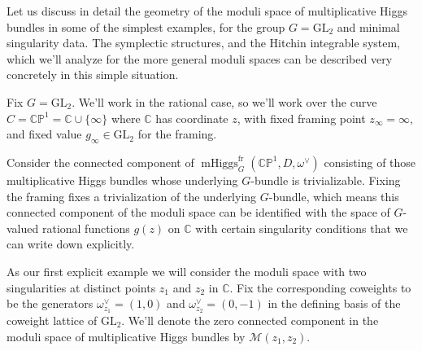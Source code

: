 \documentclass[11pt, oneside, reqno]{amsart}
\theoremstyle{definition} \newtheorem{definition}{Definition}[section]
\theoremstyle{definition} \newtheorem{remark}[definition]{Remark}
\theoremstyle{definition} \newtheorem{remarks}[definition]{Remarks}
\theoremstyle{definition} \newtheorem{question}[definition]{Question}
\theoremstyle{definition} \newtheorem*{note}{Note}
\theoremstyle{definition} \newtheorem{example}[definition]{Example}
\theoremstyle{definition} \newtheorem{examples}[definition]{Examples}
\newcommand{\bb}[1]{\mathbb{#1}}
\newcommand{\mc}[1]{\mathcal{#1}}
\newcommand{\CC}{\mathbb{C}}
\newcommand{\GL}{\mathrm{GL}}
\DeclareMathOperator{\mhiggs}{mHiggs}
\newcommand{\fr}{\mathrm{fr}}
\begin{document}
Let us discuss in detail the geometry of the moduli space of multiplicative Higgs bundles in some of the simplest examples, for the group $G = \GL_2$ and minimal singularity data.  The symplectic structures, and the Hitchin integrable system, which we'll analyze for the more general moduli spaces can be described very concretely in this simple situation. 

Fix $G=\GL_2$.  We'll work in the rational case, so we'll work over the curve $C = \bb{CP}^1 = \CC \cup \{\infty\}$ where $\CC$ has coordinate $z$, with fixed framing point $z_\infty = \infty$, and fixed value $g_\infty \in \GL_2$ for the framing. 

Consider the connected component of $\mhiggs^\fr_{G}(\bb{CP}^1, D, \omega^{\vee})$ consisting of those multiplicative Higgs bundles whose underlying $G$-bundle is trivializable.  Fixing the framing fixes a trivialization of the underlying $G$-bundle, which means this connected component of the moduli space can be identified with the space of $G$-valued
rational functions $g(z)$ on $\CC$ with certain singularity conditions that we can write down explicitly.

As our first explicit example we will consider the moduli space with two singularities at distinct points $z_1$ and $z_2$ in $\CC$.  Fix the corresponding coweights to be the generators $\omega^\vee_{z_1} = (1,0)$ and $\omega^\vee_{z_2} = (0,-1)$ in the defining basis of the coweight lattice of $\GL_2$.  We'll denote the zero connected component in the moduli space of multiplicative Higgs bundles by $\mc M(z_1,z_2)$.
 
\end{document}

